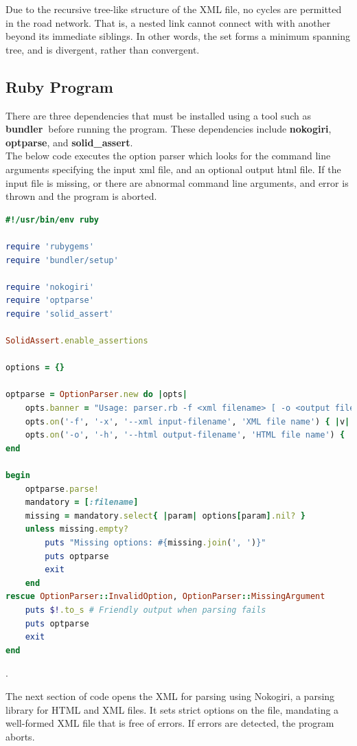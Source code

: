 \documentclass{article}
\begin{document}
Due to the recursive tree-like structure of the XML file, no cycles are permitted in the road network. That is, a nested link cannot connect with with another beyond its immediate siblings. In other words, the set forms a minimum spanning tree, and is divergent, rather than convergent.

\subsection{Ruby Program}

There are three dependencies that must be installed using a tool such as \textbf{bundler}\textbf\ before running the program. These dependencies include \textbf{nokogiri},  \textbf{optparse}, and \textbf{solid\_assert}.\\

The below code executes the option parser which looks for the command line arguments specifying the input xml file, and an optional output html file. If the input file is missing, or there are abnormal command line arguments, and error is thrown and the program is aborted.\\

\begin{lstlisting}[language=ruby]
#!/usr/bin/env ruby

require 'rubygems'
require 'bundler/setup'

require 'nokogiri'
require 'optparse'
require 'solid_assert'

SolidAssert.enable_assertions

options = {}

optparse = OptionParser.new do |opts|
	opts.banner = "Usage: parser.rb -f <xml filename> [ -o <output filename> ]"
	opts.on('-f', '-x', '--xml input-filename', 'XML file name') { |v| options[:filename] = v }
	opts.on('-o', '-h', '--html output-filename', 'HTML file name') { |v| options[:output] = v }
end

begin
	optparse.parse!
	mandatory = [:filename]
	missing = mandatory.select{ |param| options[param].nil? }
	unless missing.empty?     
		puts "Missing options: #{missing.join(', ')}"  
		puts optparse                                    
		exit               
	end  
rescue OptionParser::InvalidOption, OptionParser::MissingArgument 
	puts $!.to_s # Friendly output when parsing fails
	puts optparse                                                     
	exit      
end
\end{lstlisting}.

The next section of code opens the XML for parsing using Nokogiri, a parsing library for HTML and XML files. It sets strict options on the file, mandating a well-formed XML file that is free of errors. If errors are detected, the program aborts.\\
\end{document}

